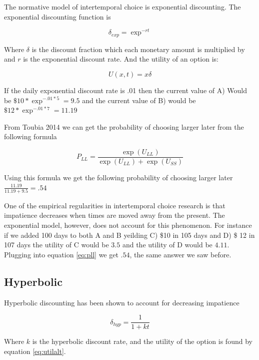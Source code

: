 \documentclass[]{article}
\begin{document}
The normative model of intertemporal choice is exponential discounting.
The exponential discounting function is  

\begin{equation}\label{eq:exp}
	\delta_{exp} = \exp^{-rt}
\end{equation}


Where $\delta$ is the discount fraction which each monetary amount is multiplied by and $r$ is the exponential discount rate. And the utility of an option is:

\begin{equation}\label{eq:utilalt}
	U(x, t) = x \delta
\end{equation}



 If the daily exponential discount rate is .01 then the current value of A) Would be $\$10 * \exp^{-.01*5} = 9.5$ and the current value of B) would be $\$12 * \exp^{-.01*7} = 11.19$

From \cite{@Toubia2014} Toubia 2014 we can get the probability of choosing larger later from the following formula

\begin{equation}\label{eq:pll}
	P_{LL} = \frac{\exp(U_{LL})}{\exp(U_{LL})+ \exp(U_{SS})}
\end{equation}


Using this formula we get the following probability of choosing larger later $\frac{11.19}{11.19+9.5} = .54$

One of the empirical regularities in intertemporal choice research is that impatience decreases when times are moved away from the present. The exponential model, however, does not account for this phenomenon. For instance if we added 100 days to both A and B yeilding C) \$10 in 105 days and D) \$ 12 in 107 days the utility of C would be $3.5$ and the utility of D would be $4.11$. Plugging into equation \ref{eq:pll} we get $.54$, the same answer we saw before. 

\subsection{Hyperbolic}

Hyperbolic discounting has been shown to account for decreasing impatience

\begin{equation}\label{eq:hyp}
\delta_{hyp} = \frac{1}{1+kt}
\end{equation}

Where $k$ is the hyperbolic discount rate, and the utility of the option is found by equation \ref{eq:utilalt}.
\end{document}
